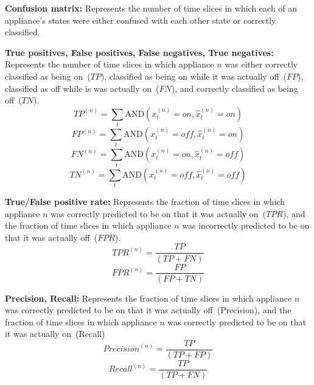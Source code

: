 \documentclass{sig-alternate}
\begin{document}
\textbf{Confusion matrix:} Represents the number of time slices in which each of an appliance's states were either confused with each other state or correctly classified.

\textbf{True positives, False positives, False negatives, True negatives:} Represents the number of time slices in which appliance $n$ was either correctly classified as being on~($\mathit{TP}$), classified as being on while it was actually off~($\mathit{FP}$), classified as off while is was actually on~($\mathit{FN}$), and correctly classified as being off~($\mathit{TN}$).
\begin{equation}
\mathit{TP}^{(n)} = 
\sum_{t}
\mathrm{AND} \left ( x^{(n)}_t = \mathit{on}, \hat{x}^{(n)}_t = \mathit{on} \right )
\end{equation}
\begin{equation}
\mathit{FP}^{(n)} = 
\sum_{t}
\mathrm{AND} \left ( x^{(n)}_t = \mathit{off}, \hat{x}^{(n)}_t = \mathit{on} \right )
\end{equation}
\begin{equation}
\mathit{FN}^{(n)} = 
\sum_{t}
\mathrm{AND} \left ( x^{(n)}_t = \mathit{on}, \hat{x}^{(n)}_t = \mathit{off} \right )
\end{equation}
\begin{equation}
\mathit{TN}^{(n)} = 
\sum_{t}
\mathrm{AND} \left ( x^{(n)}_t = \mathit{off}, \hat{x}^{(n)}_t = \mathit{off} \right )
\end{equation}

\textbf{True/False positive rate:} Represents the fraction of time slices in which appliance $n$ was correctly predicted to be on that it was actually on~($\mathit{TPR}$), and the fraction of time slices in which appliance $n$ was incorrectly predicted to be on that it was actually off~($\mathit{FPR}$).
\begin{equation}
\mathit{TPR}^{(n)} = \frac{\mathit{TP}}{\left ( \mathit{TP} + \mathit{FN} \right )}
\end{equation}
\begin{equation}
\mathit{FPR}^{(n)} = \frac{\mathit{FP}}{\left ( \mathit{FP} + \mathit{TN} \right )}
\end{equation}

\textbf{Precision, Recall:} Represents the fraction of time slices in which appliance $n$ was correctly predicted to be on that it was actually off~(Precision), and the fraction of time slices in which appliance $n$ was correctly predicted to be on that it was actually on~(Recall)
\begin{equation}
\mathit{Precision}^{(n)} = \frac{\mathit{TP}}{\left ( \mathit{TP} + \mathit{FP} \right )}
\end{equation}
\begin{equation}
\mathit{Recall}^{(n)} = \frac{\mathit{TP}}{\left ( \mathit{TP} + \mathit{FN} \right )}
\end{equation}
\end{document}
